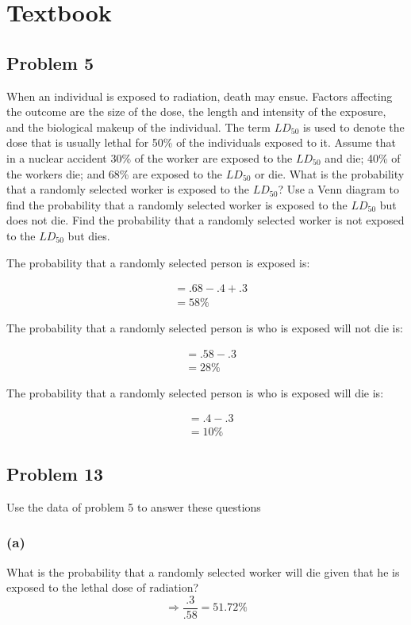 \documentclass{article}
\begin{document}
\section*{Textbook}
\subsection*{Problem 5}
When an individual is exposed to radiation, death may ensue. Factors affecting the outcome are the size of the dose, the length and intensity of the exposure, and the biological makeup of the individual. The term $LD_{50}$ is used to denote the dose that is usually lethal for 50\% of the individuals exposed to it. Assume that in a nuclear accident 30\% of the worker are exposed to the $LD_{50}$ and die; 40\% of the workers die; and 68\% are exposed to the $LD_{50}$ or die. What is the probability that a randomly selected worker is exposed to the $LD_{50}$? Use a Venn diagram to find the probability that a randomly selected worker is exposed to the $LD_{50}$ but does not die. Find the probability that a randomly selected worker is not exposed to the $LD_{50}$ but dies.
\begin{center}
    The probability that a randomly selected person is exposed is:
\end{center}
\begin{align}
    &= .68 -.4 +.3\\
    &= \boxed{58\%} 
\end{align}
\begin{center}
    The probability that a randomly selected person is who is exposed will not die is:
\end{center}
\begin{align}
    &= .58 -.3\\
    &= \boxed{28\%} 
\end{align}
\begin{center}
    The probability that a randomly selected person is who is exposed will die is:
\end{center}
\begin{align}
    &= .4 -.3\\
    &= \boxed{10\%} 
\end{align}
\newpage
\subsection*{Problem 13}
Use the data of problem 5 to answer these questions
\subsubsection*{(a)}
What is the probability that a randomly selected worker will die given that he is exposed to the lethal dose of radiation?  
\begin{equation}
    \Rightarrow \frac{.3}{.58} = \boxed{51.72\%}
\end{equation}
\end{document}
